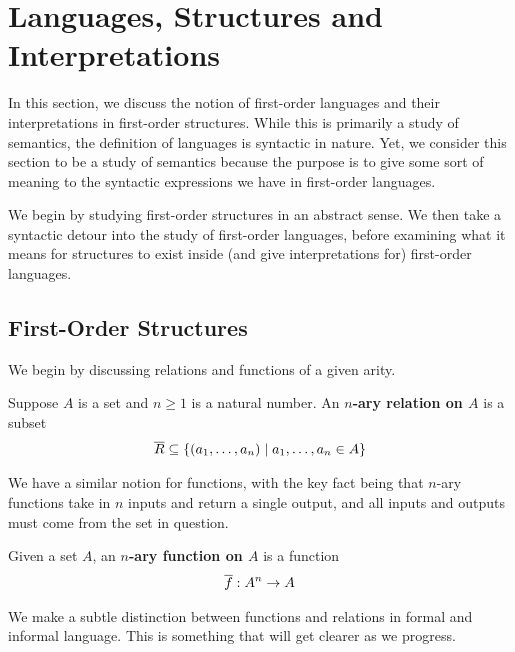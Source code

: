 \section{Languages, Structures and Interpretations}

In this section, we discuss the notion of first-order languages and their interpretations in first-order structures. While this is primarily a study of semantics, the definition of languages is syntactic in nature. Yet, we consider this section to be a study of semantics because the purpose is to give some sort of meaning to the syntactic expressions we have in first-order languages.

We begin by studying first-order structures in an abstract sense. We then take a syntactic detour into the study of first-order languages, before examining what it means for structures to exist inside (and give interpretations for) first-order languages.

\subsection{First-Order Structures}

We begin by discussing relations and functions of a given arity.

\begin{boxdefinition}
    Suppose $A$ is a set and $n \geq 1$ is a natural number. An \textbf{$n$-ary relation on $A$} is a subset
    \begin{align*}
        \overline{R} \subseteq \left\{ \left( a_1, \ldots, a_n \right) \; \middle\vert \; a_1, \ldots, a_n \in A \right\}
    \end{align*}
\end{boxdefinition}

We have a similar notion for functions, with the key fact being that $n$-ary functions take in $n$ inputs and return a single output, and all inputs and outputs must come from the set in question.

\begin{boxdefinition}
    Given a set $A$, an \textbf{$n$-ary function on $A$} is a function
    \begin{align*}
        \overline{f}: A^n \to A
    \end{align*}
\end{boxdefinition}

We make a subtle distinction between functions and relations in formal and informal language. This is something that will get clearer as we progress.

